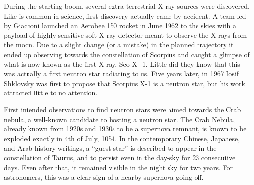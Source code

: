 

During the starting boom, several extra-terrestrial X-ray sources were discovered.
Like is common in science, first discovery actually came by accident.
A team led by Giacconi launched an Aerobee 150 rocket in June 1962 to the skies with a payload of highly sensitive soft X-ray detector meant to observe the X-rays from the moon.
Due to a slight change (or a mistake) in the planned trajectory it ended up observing towards the constellation of Scorpius and caught a glimpse of what is now known as the first X-ray, Sco X$-$1.
Little did they know that this was actually a first neutron star radiating to us.
Five years later, in 1967 Iosif Shklovsky was first to propose that Scorpius X-1 is a neutron star\cite{Shklovsky67}, but his work attracted little to no attention.

First intended observations to find neutron stars were aimed towards the Crab nebula, a well-known candidate to hosting a neutron star.
The Crab Nebula, already known from 1920s and 1930s to be a supernova remnant, is known to be exploded exactly in 4th of July, 1054.\cite{Oort, Lundmark21, Mayall39, HistSupernovas}
In the contemporary Chinese, Japanese, and Arab history writings, a ``guest star'' is described to appear in the constellation of Taurus, and to persist even in the day-sky for 23 consecutive days.
Even after that, it remained visible in the night sky for two years.
For astronomers, this was a clear sign of a nearby supernova going off.


